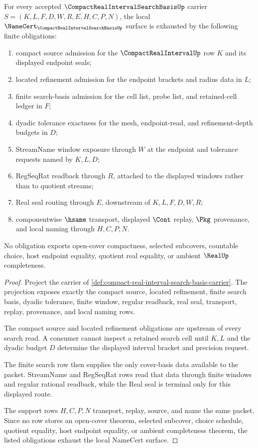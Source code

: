 \begin{theorem}
\label{thm:compact-real-interval-search-basis-obligations}
For every accepted $\CompactRealIntervalSearchBasisUp$ carrier $S=(K,L,F,D,W,R,E,H,C,P,N)$, the local $\NameCert_{\CompactRealIntervalSearchBasisUp}$ surface is exhausted by the following finite obligations:
\begin{enumerate}
\item compact source admission for the $\CompactRealIntervalUp$ row $K$ and its displayed endpoint seals;
\item located refinement admission for the endpoint brackets and radius data in $L$;
\item finite search-basis admission for the cell list, probe list, and retained-cell ledger in $F$;
\item dyadic tolerance exactness for the mesh, endpoint-read, and refinement-depth budgets in $D$;
\item StreamName window exposure through $W$ at the endpoint and tolerance requests named by $K,L,D$;
\item RegSeqRat readback through $R$, attached to the displayed windows rather than to quotient streams;
\item Real seal routing through $E$, downstream of $K,L,F,D,W,R$;
\item componentwise $\hsame$ transport, displayed $\Cont$ replay, $\Pkg$ provenance, and local naming through $H,C,P,N$.
\end{enumerate}
No obligation exports open-cover compactness, selected subcovers, countable choice, host endpoint equality, quotient real equality, or ambient $\RealUp$ completeness.
\end{theorem}
\begin{proof}
Project the carrier of \autoref{def:compact-real-interval-search-basis-carrier}. The projection exposes exactly the compact source, located refinement, finite search basis, dyadic tolerance, finite window, regular readback, real seal, transport, replay, provenance, and local naming rows.

The compact source and located refinement obligations are upstream of every search read. A consumer cannot inspect a retained search cell until $K,L$ and the dyadic budget $D$ determine the displayed interval bracket and precision request.

The finite search row then supplies the only cover-basis data available to the packet. StreamName and RegSeqRat rows read that data through finite windows and regular rational readback, while the Real seal is terminal only for this displayed route.

The support rows $H,C,P,N$ transport, replay, source, and name the same packet. Since no row stores an open-cover theorem, selected subcover, choice schedule, quotient equality, host endpoint equality, or ambient completeness theorem, the listed obligations exhaust the local NameCert surface.
\end{proof}

